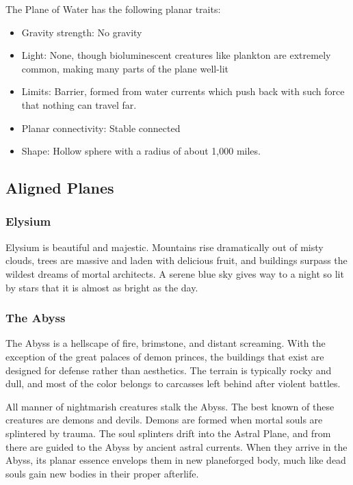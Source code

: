       The Plane of Water has the following planar traits:
      \begin{itemize}
        \item Gravity strength: No gravity
        \item Light: None, though bioluminescent creatures like plankton are extremely common, making many parts of the plane well-lit
        \item Limits: Barrier, formed from water currents which push back with such force that nothing can travel far.
        \item Planar connectivity: Stable connected
        \item Shape: Hollow sphere with a radius of about 1,000 miles.
      \end{itemize}

  \subsection{Aligned Planes}\label{Aligned Planes}

    \subsubsection{Elysium}
      Elysium is beautiful and majestic.
      Mountains rise dramatically out of misty clouds, trees are massive and laden with delicious fruit, and buildings surpass the wildest dreams of mortal architects.
      A serene blue sky gives way to a night so lit by stars that it is almost as bright as the day.

    \subsubsection{The Abyss}
      The Abyss is a hellscape of fire, brimstone, and distant screaming.
      With the exception of the great palaces of demon princes, the buildings that exist are designed for defense rather than aesthetics.
      The terrain is typically rocky and dull, and most of the color belongs to carcasses left behind after violent battles.

      All manner of nightmarish creatures stalk the Abyss.
      The best known of these creatures are demons and devils.
      Demons are formed when mortal souls are splintered by trauma.
      The soul splinters drift into the Astral Plane, and from there are guided to the Abyss by ancient astral currents.
      When they arrive in the Abyss, its planar essence envelops them in new planeforged body, much like dead souls gain new bodies in their proper afterlife.

